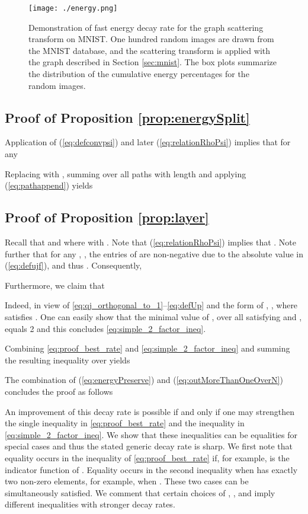 \documentclass{article}
\begin{document}
\begin{figure}[!ht]
    \centering
    \texttt{[image: ./energy.png]}
 	\caption{Demonstration of fast energy decay rate for the graph scattering transform on MNIST. One hundred random images are drawn from the MNIST database, and the scattering transform is applied with the graph described in  Section \ref{sec:mnist}. The box plots summarize the distribution of the cumulative energy percentages for the random images.}
    \label{fig:energy}
\end{figure}

\subsection{Proof of Proposition \ref{prop:energySplit}}
Application of (\ref{eq:defconvpsi}) and later (\ref{eq:relationRhoPsi}) implies that for any 


Replacing  with , summing over all paths with length  and applying (\ref{eq:pathappend}) yields


\subsection{Proof of Proposition \ref{prop:layer}}
Recall that  and  where  with . Note that (\ref{eq:relationRhoPsi}) implies that . Note further that for any , , the entries of  are non-negative due to the absolute value in (\ref{eq:defujf}), and thus . Consequently,

Furthermore, we claim that 

Indeed, in view of \eqref{eq:qj_orthogonal_to_1}--\eqref{eq:defUp} and the form of , , where  satisfies . One can easily show that the minimal value of , over all  satisfying  and , equals 2 and this concludes \eqref{eq:simple_2_factor_ineq}.


Combining \eqref{eq:proof_best_rate} and \eqref{eq:simple_2_factor_ineq} and summing the resulting inequality over  yields

The combination of (\ref{eq:energyPreserve}) and (\ref{eq:outMoreThanOneOverN}) concludes the proof as follows


An improvement of this decay rate is possible if and only if one may strengthen the single inequality in \eqref{eq:proof_best_rate} and the inequality in \eqref{eq:simple_2_factor_ineq}. We show that these inequalities can be equalities for special cases and thus the stated generic decay rate is sharp. We first note that equality occurs in the inequality of \eqref{eq:proof_best_rate}  if, for example,  is the indicator function of . Equality occurs in the second inequality when  has exactly two non-zero elements, for example, when . 
These two cases can be simultaneously satisfied. 
We comment that certain choices of , ,  and  imply different inequalities with stronger decay rates. 
\end{document}
